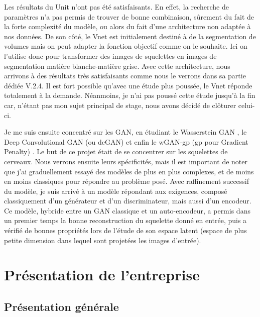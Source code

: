 \documentclass[12pt, oneside, a4paper, titlepage]{article}
\begin{document}
\vspace{5mm} 

Les résultats du Unit n'ont pas été satisfaisants. En effet, la recherche de paramètres n'a pas permis de trouver de bonne combinaison, sûrement du fait de la forte complexité du modèle, ou alors du fait d'une architecture non adaptée à nos données.
De son côté, le Vnet est initialement destiné à de la segmentation de volumes mais on peut adapter la fonction objectif comme on le souhaite. Ici on l’utilise donc pour transformer des images de squelettes en images de segmentation matière blanche-matière grise. Avec cette architecture, nous arrivons à des résultats très satisfaisants comme nous le verrons dans sa partie dédiée V.2.4. Il est fort possible qu’avec une étude plus poussée, le Vnet réponde totalement à la demande. Néanmoins, je n’ai pas poussé cette étude jusqu'à la fin car, n'étant pas mon sujet principal de stage, nous avons décidé de clôturer celui-ci.

\vspace{5mm} 

Je me suis ensuite concentré sur les GAN, en étudiant le Wasserstein GAN \cite{arjovsky_wasserstein_2017}, le Deep Convolutional GAN (ou dcGAN) \cite{radford_unsupervised_2016} et enfin le wGAN-gp (gp pour Gradient Penalty) \cite{gulrajani_improved_2017}. Le but de ce projet était de se concentrer sur les squelettes de cerveaux. Nous verrons ensuite leurs spécificités, mais il est important de noter que j’ai graduellement essayé des modèles de plus en plus complexes, et de moins en moins classiques pour répondre au problème posé. Avec raffinement successif du modèle, je suis arrivé à un modèle répondant aux exigences, composé classiquement d’un générateur et d’un discriminateur, mais aussi d’un encodeur. Ce modèle, hybride entre un GAN classique et un auto-encodeur, a permis dans un premier temps la bonne reconstruction du squelette donné en entrée, puis a vérifié de bonnes propriétés lors de l’étude de son espace latent (espace de plus petite dimension dans lequel sont projetées les images d’entrée).


\newpage
\section{Présentation de l’entreprise}


\subsection{Présentation générale}
\end{document}
